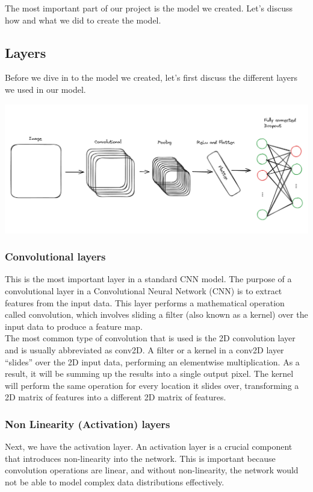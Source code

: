 \documentclass[../paper.tex]{subfiles}
\begin{document}
    The most important part of our project is the model we created.
    Let's discuss how and what we did to create the model.

    \subsection{Layers}
    Before we dive in to the model we created, let's first discuss the different layers we used in our model.

    \includegraphics[width=\linewidth]{network}

    \subsubsection{Convolutional layers}
    This is the most important layer in a standard CNN model.
    The purpose of a convolutional layer in a Convolutional Neural Network (CNN) is to extract features from the input data. 
    This layer performs a mathematical operation called convolution, 
    which involves sliding a filter (also known as a kernel) over the input data to produce a feature map.\cite{o4}\\
    The most common type of convolution that is used is the 2D convolution layer and is usually abbreviated as conv2D. 
    A filter or a kernel in a conv2D layer “slides” over the 2D input data, performing an elementwise multiplication. 
    As a result, it will be summing up the results into a single output pixel. 
    The kernel will perform the same operation for every location it slides over, transforming a 2D matrix of features into a different 2D matrix of features.\cite{o5}
    \subsubsection{Non Linearity (Activation) layers}
    Next, we have the activation layer.
    An activation layer is a crucial component that introduces non-linearity into the network. 
    This is important because convolution operations are linear, and without non-linearity, the network would not be able to model complex data distributions effectively.
\end{document}
